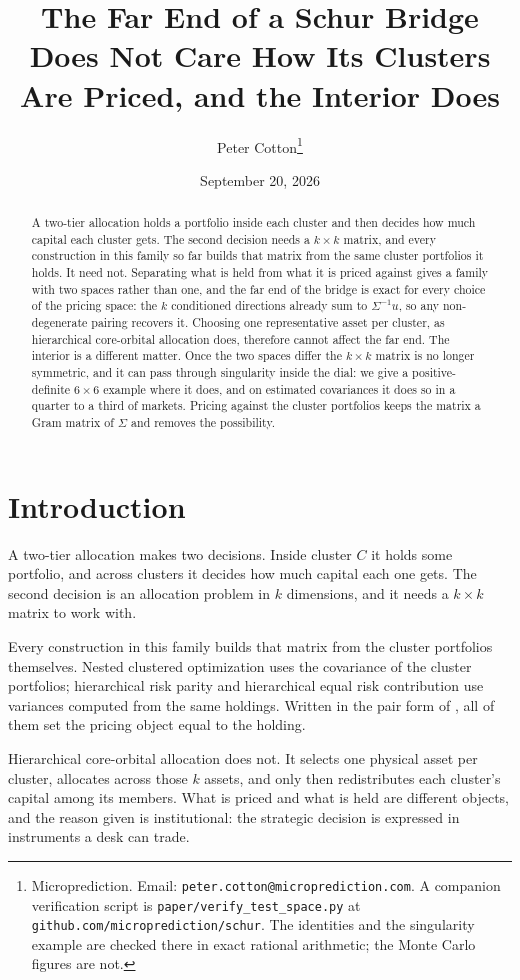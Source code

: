 \documentclass[11pt]{article}
\title{The Far End of a Schur Bridge Does Not Care How Its Clusters\\
Are Priced, and the Interior Does}
\author{Peter Cotton\thanks{Microprediction.
Email: \texttt{peter.cotton@microprediction.com}. A companion verification
script is \texttt{paper/verify\_test\_space.py} at
\texttt{github.com/microprediction/schur}. The identities and the
singularity example are checked there in exact rational arithmetic; the
Monte Carlo figures are not.}}
\date{September 20, 2026}
\begin{document}
\maketitle

\begin{abstract}
A two-tier allocation holds a portfolio inside each cluster and then decides
how much capital each cluster gets. The second decision needs a $k\times k$
matrix, and every construction in this family so far builds that matrix from
the same cluster portfolios it holds. It need not. Separating what is held
from what it is priced against gives a family with two spaces rather than one,
and the far end of the bridge is exact for every choice of the pricing space:
the $k$ conditioned directions already sum to $\Sigma^{-1}u$, so any
non-degenerate pairing recovers it. Choosing one representative asset per
cluster, as hierarchical core-orbital allocation does, therefore cannot affect
the far end. The interior is a different matter. Once the two spaces differ the
$k\times k$ matrix is no longer symmetric, and it can pass through singularity
inside the dial: we give a positive-definite $6\times6$ example where it does,
and on estimated covariances it does so in a quarter to a third of markets. Pricing
against the cluster portfolios keeps the matrix a Gram matrix of $\Sigma$ and
removes the possibility.
\end{abstract}

\section{Introduction}

A two-tier allocation makes two decisions. Inside cluster $C$ it holds some
portfolio, and across clusters it decides how much capital each one gets. The
second decision is an allocation problem in $k$ dimensions, and it needs a
$k\times k$ matrix to work with.

Every construction in this family builds that matrix from the cluster
portfolios themselves. Nested clustered optimization \cite{lopezdeprado2020}
uses the covariance of the cluster portfolios; hierarchical risk parity
\cite{lopezdeprado2016} and hierarchical equal risk contribution
\cite{raffinot2018} use variances computed from the same holdings. Written in
the pair form of \cite{cotton2024schur}, all of them set the pricing object
equal to the holding.

Hierarchical core-orbital allocation \cite{bajo2026} does not. It selects one
physical asset per cluster, allocates across those $k$ assets, and only then
redistributes each cluster's capital among its members. What is priced and what
is held are different objects, and the reason given is institutional: the
strategic decision is expressed in instruments a desk can trade.
\end{document}
